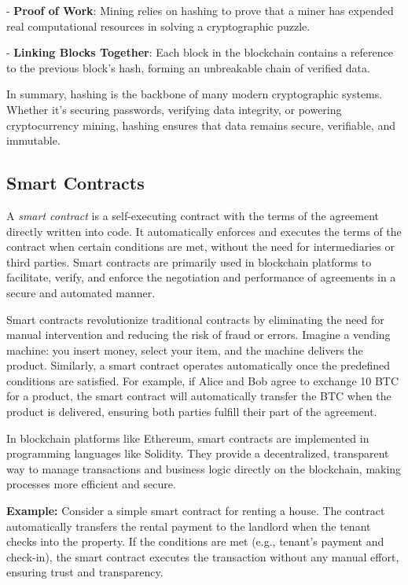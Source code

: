 \documentclass[12pt,a4paper]{report}
\begin{document}
    - \textbf{Proof of Work}: Mining relies on hashing to prove that a miner has expended real computational resources in solving a cryptographic puzzle.
    
    - \textbf{Linking Blocks Together}: Each block in the blockchain contains a reference to the previous block's hash, forming an unbreakable chain of verified data.
    
In summary, hashing is the backbone of many modern cryptographic systems. Whether it’s securing passwords, verifying data integrity, or powering cryptocurrency mining, hashing ensures that data remains secure, verifiable, and immutable.


\subsection{Smart Contracts}

\begin{tcolorbox}[colframe=black!75, colback=white, sharp corners, fonttitle=\bfseries, boxrule=0.5pt, title=\faInfoCircle\ Definition 1-11: Smart Contract]
A \textit{smart contract} is a self-executing contract with the terms of the agreement directly written into code. It automatically enforces and executes the terms of the contract when certain conditions are met, without the need for intermediaries or third parties. Smart contracts are primarily used in blockchain platforms to facilitate, verify, and enforce the negotiation and performance of agreements in a secure and automated manner.
\end{tcolorbox}

Smart contracts revolutionize traditional contracts by eliminating the need for manual intervention and reducing the risk of fraud or errors. Imagine a vending machine: you insert money, select your item, and the machine delivers the product. Similarly, a smart contract operates automatically once the predefined conditions are satisfied. For example, if Alice and Bob agree to exchange 10 BTC for a product, the smart contract will automatically transfer the BTC when the product is delivered, ensuring both parties fulfill their part of the agreement.

In blockchain platforms like Ethereum, smart contracts are implemented in programming languages like Solidity. They provide a decentralized, transparent way to manage transactions and business logic directly on the blockchain, making processes more efficient and secure. 

\textbf{Example:}
Consider a simple smart contract for renting a house. The contract automatically transfers the rental payment to the landlord when the tenant checks into the property. If the conditions are met (e.g., tenant's payment and check-in), the smart contract executes the transaction without any manual effort, ensuring trust and transparency.
\end{document}
